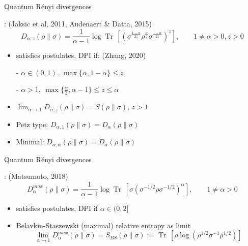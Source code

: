\documentclass[mathserif]{beamer}
\newcommand{\<}{\langle}
\renewcommand{\>}{\rangle}
\newcommand{\Tr}{\operatorname{Tr}\,}
\begin{document}
\begin{frame}{Quantum R\'enyi divergences}

: {\small (Jaksic et al, 2011, Audenaert \&
Datta, 2015)}
\[
D_{\alpha,z}(\rho\|\sigma)
=\frac1{\alpha-1}\log\Tr\left[\left(\sigma^{\frac{1-\alpha}{2z}}\rho^{\frac{\alpha}{z}}\sigma^{\frac{1-\alpha}{2z}}\right)^z
\right],\qquad 1\ne \alpha>0, z>0
\]
\begin{itemize}
\item satisfies postulates, DPI if: {\small (Zhang, 2020)}

\medskip
\qquad - $\alpha\in (0,1),\ \max\{\alpha,1-\alpha\}\le z$

\medskip 
\qquad - $\alpha>1,\
\max\{\frac{\alpha}2,\alpha-1\}\le z\le \alpha$
\vskip 3mm
\item $\lim_{\alpha\to 1} D_{\alpha,z}(\rho\|\sigma)=S(\rho\|\sigma)$, $z>1$
\vskip 3mm
\item Petz type: $D_{\alpha,1}(\rho\|\sigma)=D_\alpha(\rho\|\sigma)$
\vskip 3mm
\item Minimal: $D_{\alpha,\alpha}(\rho\|\sigma)=\tilde D_\alpha(\rho\|\sigma)$
\end{itemize}



\end{frame}


\begin{frame}{Quantum R\'enyi divergences}

: {\small (Matsumoto, 2018)}
\[
D_\alpha^{max}(\rho\|\sigma)=\frac{1}{\alpha-1}\log
\Tr\left[\sigma\left(\sigma^{-1/2}\rho\sigma^{-1/2}\right)^\alpha\right],\qquad 1\ne
\alpha>0
\]
\begin{itemize}
\item satisfies postulates, DPI if $\alpha\in (0,2]$
\vskip 3mm
\item Belavkin-Staszewski (maximal) relative entropy as limit
\[
\lim_{\alpha\to 1}D_\alpha^{max}(\rho\|\sigma)=S_{BS}(\rho\|\sigma):=\Tr\left[\rho
\log\left(\rho^{1/2}\sigma^{-1}\rho^{1/2}\right)\right]
\]


\end{itemize}

\end{frame}
\end{document}
